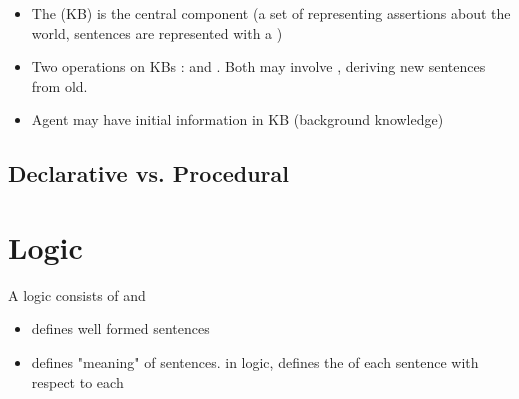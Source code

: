 \begin{itemize}
\item The  (KB) is the central component (a set of  representing assertions about the world, sentences are represented with  a )
\item Two operations on KBs :  and . Both may involve , deriving new sentences from old.
\item Agent may have initial information in KB (background knowledge)
\end{itemize}

\subsection{Declarative vs. Procedural}

\begin{center}
\end{center}
\begin{Parallel}[v]{0.48\textwidth}{0.48\textwidth}
\ParallelPar
\end{Parallel}

\section{Logic}

A logic consists of  and 
\begin{itemize}
\item {} defines well formed sentences
\item {} defines "meaning" of sentences. in logic, defines the  of each sentence with respect to each 
\end{itemize}

